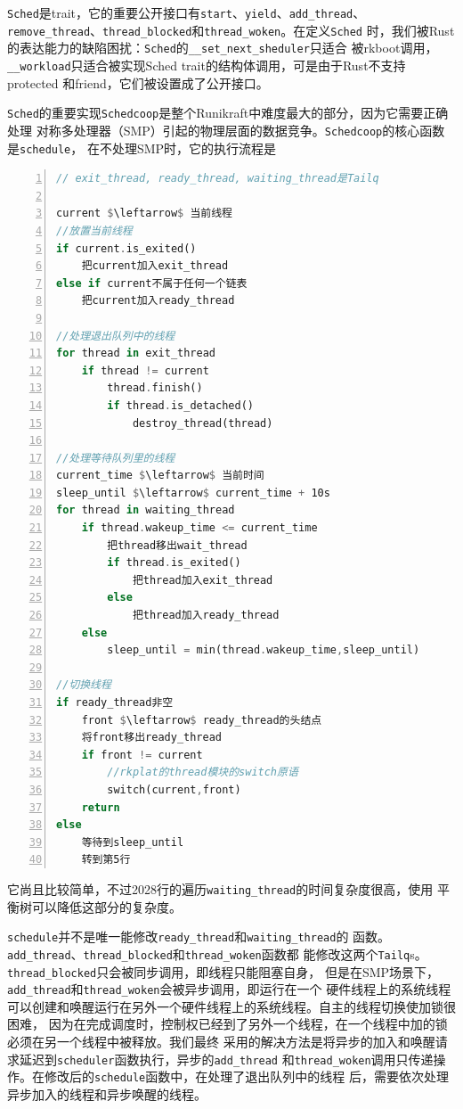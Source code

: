 \documentclass{../runikraft-report}
\begin{document}
\texttt{Sched}是trait，它的重要公开接口有\texttt{start}、\texttt{yield}、\texttt{add\_thread}、
\texttt{remove\_thread}、\linebreak\texttt{thread\_blocked}和\texttt{thread\_woken}。在定义\texttt{Sched}
时，我们被Rust的表达能力的缺陷困扰：\texttt{Sched}的\texttt{\_\_set\_next\_sheduler}只适合
被rkboot调用，\texttt{\_\_workload}只适合被实现Sched trait的结构体调用，可是由于Rust不支持protected
和friend，它们被设置成了公开接口。

\texttt{Sched}的重要实现\texttt{Schedcoop}是整个Runikraft中难度最大的部分，因为它需要正确处理
对称多处理器（SMP）引起的物理层面的数据竞争。\texttt{Schedcoop}的核心函数是\texttt{schedule}，
在不处理SMP时，它的执行流程是
\begin{lstlisting}[numbers=left,mathescape,language=Rust]
// exit_thread, ready_thread, waiting_thread是Tailq

current $\leftarrow$ 当前线程
//放置当前线程
if current.is_exited()
    把current加入exit_thread
else if current不属于任何一个链表
    把current加入ready_thread

//处理退出队列中的线程
for thread in exit_thread
    if thread != current
        thread.finish()
        if thread.is_detached()
            destroy_thread(thread)

//处理等待队列里的线程
current_time $\leftarrow$ 当前时间
sleep_until $\leftarrow$ current_time + 10s
for thread in waiting_thread
    if thread.wakeup_time <= current_time
        把thread移出wait_thread
        if thread.is_exited()
            把thread加入exit_thread
        else
            把thread加入ready_thread
    else
        sleep_until = min(thread.wakeup_time,sleep_until)

//切换线程
if ready_thread非空
    front $\leftarrow$ ready_thread的头结点
    将front移出ready_thread
    if front != current
        //rkplat的thread模块的switch原语
        switch(current,front)
    return
else
    等待到sleep_until
    转到第5行
\end{lstlisting}
它尚且比较简单，不过20\tildechar28行的遍历\texttt{waiting\_thread}的时间复杂度很高，使用
平衡树可以降低这部分的复杂度。

\texttt{schedule}并不是唯一能修改\texttt{ready\_thread}和\texttt{waiting\_thread}的
函数。\texttt{add\_thread}、\texttt{thread\_blocked}和\texttt{thread\_woken}函数都
能修改这两个\texttt{Tailq}s。\texttt{thread\_blocked}只会被同步调用，即线程只能阻塞自身，
但是在SMP场景下，\texttt{add\_thread}和\texttt{thread\_woken}会被异步调用，即运行在一个
硬件线程上的系统线程可以创建和唤醒运行在另外一个硬件线程上的系统线程。自主的线程切换使加锁很困难，
因为在完成调度时，控制权已经到了另外一个线程，在一个线程中加的锁必须在另一个线程中被释放。我们最终
采用的解决方法是将异步的加入和唤醒请求延迟到\texttt{scheduler}函数执行，异步的\texttt{add\_thread}
和\texttt{thread\_woken}调用只传递操作。在修改后的\texttt{schedule}函数中，在处理了退出队列中的线程
后，需要依次处理异步加入的线程和异步唤醒的线程。
\end{document}

